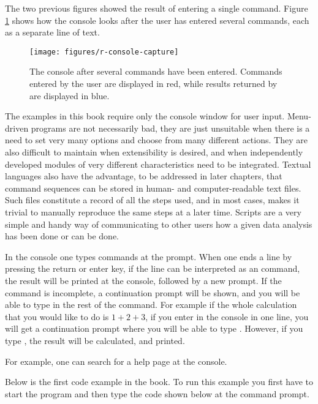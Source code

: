 \documentclass[krantz2]{krantz}\usepackage{knitr}
\begin{document}
The two previous figures showed the result of entering a single command. Figure \ref{fig:intro:console:capture} shows how the console looks after the user has entered several commands, each as a separate line of text.

\begin{figure}
  \centering
  \texttt{[image: figures/r-console-capture]}
  \caption[The R console]{The \Rpgrm console after several commands have been entered. Commands entered by the user are displayed in red, while results returned by \Rpgrm are displayed in blue.}\label{fig:intro:console:capture}
\end{figure}

The examples in this book require only the console window for user input. Menu-driven programs are not necessarily bad, they are just unsuitable when there is a need to set very many options and choose from many different actions. They are also difficult to maintain when extensibility is desired, and when independently developed modules of very different characteristics need to be integrated. Textual languages also have the advantage, to be addressed in later chapters, that command sequences can be stored in human- and computer-readable text files. Such files constitute a record of all the steps used, and in most cases, makes it trivial to manually reproduce the same steps at a later time. Scripts are a very simple and handy way of communicating to other users how a given data analysis has been done or can be done.

\begin{explainbox}
In the console one types commands at the \code{>} prompt. When one ends a line by pressing the return or enter key, if the line can be interpreted as an \Rlang command, the result will be printed at the console, followed by a new \code{>} prompt.
If the command is incomplete, a \code{+} continuation prompt will be shown, and you will be able to type in the rest of the command. For example if the whole calculation that you would like to do is $1 + 2 + 3$, if you enter in the console  in one line, you will get a continuation prompt where you will be able to type . However, if you type , the result will be calculated, and printed.
\end{explainbox}

For example, one can search for a help page at the \Rpgrm console.

\begin{infobox}
Below is the first code example in the book. To run this example you first have to start the \Rpgrm program and then type the code shown below at the command prompt.
\end{infobox}
\end{document}
